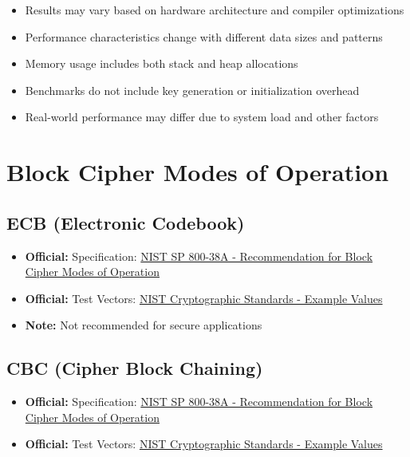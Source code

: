 \documentclass[12pt,a4paper]{article}
\newcommand{\official}[1]{\textcolor{citegreen}{\textbf{Official:}} #1}
\newcommand{\note}[1]{\textcolor{noteorange}{\textbf{Note:}} #1}
\newcommand{\link}[2]{\href{#1}{#2}}
\begin{document}
\begin{itemize}
    \item Results may vary based on hardware architecture and compiler optimizations
    \item Performance characteristics change with different data sizes and patterns
    \item Memory usage includes both stack and heap allocations
    \item Benchmarks do not include key generation or initialization overhead
    \item Real-world performance may differ due to system load and other factors
\end{itemize}

\newpage

\section{Block Cipher Modes of Operation}

\subsection{ECB (Electronic Codebook)}
\begin{itemize}
    \item \official{Specification:} \link{https://nvlpubs.nist.gov/nistpubs/SpecialPublications/NIST.SP.800-38A.pdf}{NIST SP 800-38A - Recommendation for Block Cipher Modes of Operation}
    \item \official{Test Vectors:} \link{https://csrc.nist.gov/Projects/cryptographic-standards-and-guidelines/example-values}{NIST Cryptographic Standards - Example Values}
    \item \note{Not recommended for secure applications}
\end{itemize}

\subsection{CBC (Cipher Block Chaining)}
\begin{itemize}
    \item \official{Specification:} \link{https://nvlpubs.nist.gov/nistpubs/SpecialPublications/NIST.SP.800-38A.pdf}{NIST SP 800-38A - Recommendation for Block Cipher Modes of Operation}
    \item \official{Test Vectors:} \link{https://csrc.nist.gov/Projects/cryptographic-standards-and-guidelines/example-values}{NIST Cryptographic Standards - Example Values}
\end{itemize}
\end{document}
